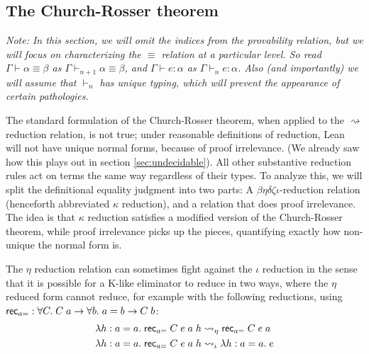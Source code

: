 \subsection{The Church-Rosser theorem}\label{sec:church_rosser}
\emph{Note: In this section, we will omit the indices from the provability relation, but we will focus on characterizing the $\equiv$ relation at a particular level. So read $\Gamma\vdash \alpha\equiv\beta$ as $\Gamma\vdash_{n+1} \alpha\equiv\beta$, and $\Gamma\vdash e:\alpha$ as $\Gamma\vdash_n e:\alpha$. Also (and importantly) we will assume that $\vdash_n$ has unique typing, which will prevent the appearance of certain pathologies.}

The standard formulation of the Church-Rosser theorem, when applied to the $\rightsquigarrow$ reduction relation, is not true; under reasonable definitions of reduction, Lean will not have unique normal forms, because of proof irrelevance. (We already saw how this plays out in section \ref{sec:undecidable}). All other substantive reduction rules act on terms the same way regardless of their types. To analyze this, we will split the definitional equality judgment into two parts: A $\beta\eta\delta\zeta\iota$-reduction relation (henceforth abbreviated $\kappa$ reduction), and a relation that does proof irrelevance. The idea is that $\kappa$ reduction satisfies a modified version of the Church-Rosser theorem, while proof irrelevance picks up the pieces, quantifying exactly how non-unique the normal form is.

The $\eta$ reduction relation can sometimes fight against the $\iota$ reduction in the sense that it is possible for a K-like eliminator to reduce in two ways, where the $\eta$ reduced form cannot reduce, for example with the following reductions, using $\mathsf{rec}_{a=}:\forall C.\;C\;a\to \forall b.\;a=b\to C\;b$:
\begin{align*}
&\lambda h:a=a.\;\mathsf{rec}_{a=}\;C\;e\;a\;h\rightsquigarrow_\eta\mathsf{rec}_{a=}\;C\;e\;a\\
&\lambda h:a=a.\;\mathsf{rec}_{a=}\;C\;e\;a\;h\rightsquigarrow_\iota\lambda h:a=a.\;e
\end{align*}

